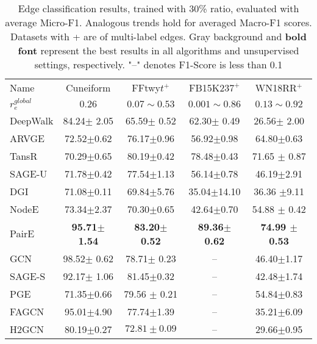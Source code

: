 \documentclass[10pt,journal,compsoc]{IEEEtran}
\begin{document}
  \begin{table*}[h]
  \begin{center}
  \caption{Edge classification results, trained with 30\% ratio, evaluated with average Micro-F1. Analogous trends hold for averaged Macro-F1 scores. Datasets with + are of multi-label edges. \colorbox{mygray}{Gray background} and \textbf{bold font} represent the best results in all algorithms and unsupervised settings, respectively. "--" denotes F1-Score is less than 0.1}
  \label{tab:edge}
\renewcommand\arraystretch{1.1}
    \begin{tabular}{p{4.5em}|c|c|c|c}
    \hline
    Name&Cuneiform&FFtwy$t^+$ &FB15K\-$237^+$ &WN18RR$^+$ \\
    $r_e^{global}$ &$0.26$ &$0.07\sim0.53 $ &$0.001\sim0.86$ &$0.13\sim0.92$  \\
    \hline
    DeepWalk &84.24$\pm$ 2.05&65.59$\pm$ 0.52 & 62.30$\pm$ 0.49 & 26.56$\pm$ 2.00\\
    ARVGE& 72.52$\pm$0.62 & 76.17$\pm$0.96 & 56.92$\pm$0.98 & 64.80$\pm$0.63\\
    TansR&70.29$\pm$0.65 &80.19$\pm$0.42 &78.48$\pm$0.43 &71.65 $\pm$ 0.87\\
    SAGE-U &71.78$\pm$0.42 &77.54$\pm$1.13 &56.14$\pm$0.78 & 46.19$\pm$2.91\\
    DGI&71.08$\pm$0.11 &69.84$\pm$5.76 & 35.04$\pm$14.10 & 36.36 $\pm$9.11 \\
    NodeE&73.34$\pm$2.37 &70.30$\pm$0.65 & 42.64$\pm$0.70 &54.88 $\pm$ 0.42\\
    PairE&\textbf{95.71$\pm$1.54} &\colorbox{mygray}{\textbf{83.20$\pm$ 0.52}} &\colorbox{mygray}{\textbf{89.36$\pm$0.62}} & \colorbox{mygray}{\textbf{74.99 $\pm$ 0.53}} \\
    \hline
    GCN&\colorbox{mygray}{98.52$\pm$ 0.62} & 78.71$\pm$ 0.23 & -- & 46.40$\pm$1.17 \\
    SAGE-S & 92.17$\pm$ 1.06 & 81.45$\pm$0.32 & -- & 42.48$\pm$1.74 \\
    PGE & 71.35$\pm$0.66 & 79.56 $\pm$ 0.21 & -- & 54.84$\pm$0.83 \\
    FAGCN& 95.01$\pm$4.90	&77.74$\pm$1.39	& -- & 35.21$\pm$6.09 \\
    H2GCN& 80.19$\pm$0.27 & $72.81\pm0.09$& -- & 29.66$\pm$0.95\\
    \hline
    \end{tabular}
    \end{center}
\end{table*}
\end{document}
